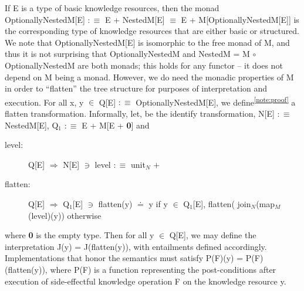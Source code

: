 \documentclass[runningheads]{llncs}
\begin{document}
If E is a type of basic knowledge resources, then the monad
OptionallyNestedM[E] $:\equiv$ E + NestedM[E] $\equiv$ E + M[OptionallyNestedM[E]] is the corresponding type of knowledge resources that are either basic or structured.
We note that OptionallyNestedM[E] is isomorphic to the free monad of M, and thus it is not surprising that OptionallyNestedM and NestedM = M $\circ$ OptionallyNestedM are both monads;
this holds for any functor -- it does not depend on M being a monad. 
However, we do need the monadic properties of M in order to ``flatten'' the tree structure for purposes of interpretation and execution.
For all x, y $\in$ Q[E] $:\equiv$ OptionallyNestedM[E], we define\textsuperscript{\ref{note:proof}}  a flatten transformation. Informally, let,  be the identify transformation, N[E] $:\equiv$ NestedM[E], Q$_1$ $:\equiv$ E + M[E + \textbf{0}] and
\begin{description}
\item[level:] Q[E] $\Rightarrow$ N[E]
 $\ni$ level $:\equiv$ unit$_N$ $+$ 
\item[flatten:] Q[E] $\Rightarrow$ Q$_1$[E] $\ni$ flatten(y)   $\doteq$ y if y $\in$  Q$_1$[E], \newline flatten( join$_N$(map$_M$(level)(y)) otherwise
\end{description}
\noindent where \textbf{0} is the empty type.
Then for all y $\in$ Q[E], we may define the interpretation J(y) = J(flatten(y)), with entailments defined accordingly. %
Implementations that honor the semantics must satisfy P(F)(y) = P(F)(flatten(y)), where P(F) is a function representing the post-conditions after execution of side-effectful knowledge operation F on the knowledge resource y.
\end{document}
